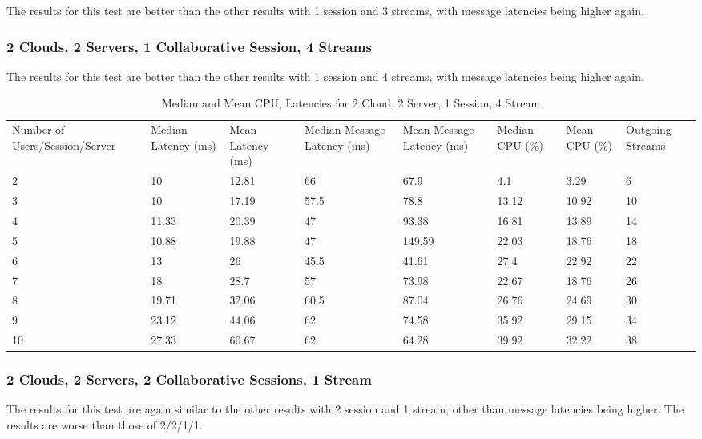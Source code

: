 The results for this test are better than the other results with 1 session and 3 streams, with message latencies being higher again.

\subsubsection{2 Clouds, 2 Servers, 1 Collaborative Session, 4 Streams}

The results for this test are better than the other results with 1 session and 4 streams, with message latencies being higher again.

\begin{table}
\caption{Median and Mean CPU, Latencies for 2 Cloud, 2 Server, 1 Session, 4 Stream}
\label{table:2cld_2serv_1sess_4str}
\begin{tabu} to\linewidth{|X[c]|X[c]|X[c]|X[c]|X[c]|X[c]|X[c]|X[c]|}
\everyrow{\hline}
\hline
Number of Users/Session/Server & Median Latency (ms) & Mean Latency (ms) & Median Message Latency (ms) & Mean Message Latency (ms) & Median CPU (\%) & Mean CPU (\%) & Outgoing Streams\\
2 & 10 & 12.81 & 66 & 67.9 & 4.1 & 3.29 & 6 \\
3 & 10 & 17.19 & 57.5 & 78.8 & 13.12 & 10.92 & 10 \\
4 & 11.33 & 20.39 & 47 & 93.38 & 16.81 & 13.89 & 14 \\
5 & 10.88 & 19.88 & 47 & 149.59 & 22.03 & 18.76 & 18 \\
6 & 13 & 26 & 45.5 & 41.61 & 27.4 & 22.92 & 22 \\
7 & 18 & 28.7 & 57 & 73.98 & 22.67 & 18.76 & 26 \\
8 & 19.71 & 32.06 & 60.5 & 87.04 & 26.76 & 24.69 & 30 \\
9 & 23.12 & 44.06 & 62 & 74.58 & 35.92 & 29.15 & 34 \\
10 & 27.33 & 60.67 & 62 & 64.28 & 39.92 & 32.22 & 38 \\
\end{tabu}
\end{table}

\clearpage\subsubsection{2 Clouds, 2 Servers, 2 Collaborative Sessions, 1 Stream}

The results for this test are again similar to the other results with 2 session and 1 stream, other than message latencies being higher. The results are worse than those of 2/2/1/1.

